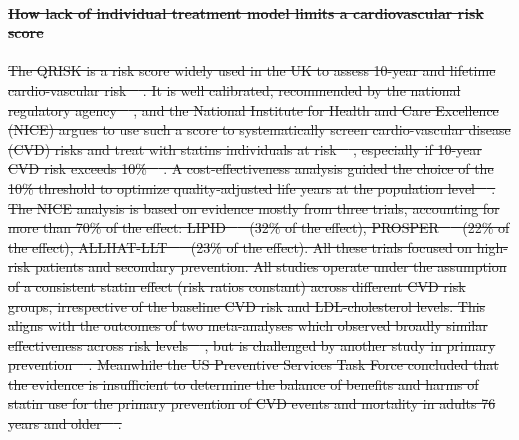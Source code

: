 \documentclass[10pt,letterpaper]{article}
\providecommand{\DIFdeltex}[1]{{\protect\color{red}\sout{#1}}}                      %
\providecommand{\DIFdelbegin}{} %
\providecommand{\DIFdelend}{} %
\providecommand{\DIFdel}[1]{\texorpdfstring{\DIFdeltex{#1}}{}} %
\newcommand{\DIFscaledelfig}{0.5}
\newlength{\DIFdelgraphicswidth} %
\newlength{\DIFdelgraphicsheight} %
\newcommand{\DIFdelincludegraphics}[2][]{%
\sbox{\DIFdelgraphicsbox}{\DIFOincludegraphics[#1]{#2}}%
\settoboxwidth{\DIFdelgraphicswidth}{\DIFdelgraphicsbox} %
\settoboxtotalheight{\DIFdelgraphicsheight}{\DIFdelgraphicsbox} %
\scalebox{\DIFscaledelfig}{%
\parbox[b]{\DIFdelgraphicswidth}{\usebox{\DIFdelgraphicsbox}\\[-\baselineskip] \rule{\DIFdelgraphicswidth}{0em}}\llap{\resizebox{\DIFdelgraphicswidth}{\DIFdelgraphicsheight}{%
\setlength{\unitlength}{\DIFdelgraphicswidth}%
\begin{picture}(1,1)%
\thicklines\linethickness{2pt} %
{\color[rgb]{1,0,0}\put(0,0){\framebox(1,1){}}}%
{\color[rgb]{1,0,0}\put(0,0){\line( 1,1){1}}}%
{\color[rgb]{1,0,0}\put(0,1){\line(1,-1){1}}}%
\end{picture}%
}\hspace*{3pt}}} %
} %
\DeclareRobustCommand{\DIFdelbegin}{\DIFOdelbegin \let\includegraphics\DIFdelincludegraphics} %
\DeclareRobustCommand{\DIFdelend}{\DIFOaddend \let\includegraphics\DIFOincludegraphics} %
\begin{document}
\DIFdelbegin \paragraph{\DIFdel{How lack of individual treatment model limits a cardiovascular risk score}}
\addtocounter{paragraph}{-1}%
\DIFdel{The QRISK is a risk score widely used in the UK to assess 10-year and lifetime cardio-vascular risk \mbox{%
\cite{hippisley2017development}}\hskip0pt%
. It is well calibrated, recommended by the national regulatory agency \mbox{%
\cite{guideline2023cardiovascular}}\hskip0pt%
, and the National Institute for Health and Care Excellence (NICE) argues to use such a score to systematically screen cardio-vascular disease (CVD) risks and treat with statins individuals at risk \mbox{%
\cite{guideline2023cardiovascular}}\hskip0pt%
, especially if 10-year CVD risk exceeds 10\% \mbox{%
\cite{rabar2014lipid}}\hskip0pt%
.
A cost-effectiveness analysis guided the choice of the 10\% threshold to optimize quality-adjusted life years at the population level \mbox{%
\cite{guthrie2023competing}}\hskip0pt%
. The NICE analysis is based on evidence mostly from three trials, accounting for more than 70\% of the effect: LIPID \mbox{%
\cite{long1998prevention} }\hskip0pt%
(32\% of the effect), PROSPER \mbox{%
\cite{shepherd2002pravastatin} }\hskip0pt%
(22\% of the effect), ALLHAT-LLT \mbox{%
\cite{antihypertensive2002major} }\hskip0pt%
(23\% of the effect). All these trials focused on high-risk patients and secondary prevention. All studies operate under the assumption of a consistent statin effect (risk ratios constant) across different CVD risk groups, irrespective of the baseline CVD risk and LDL-cholesterol levels. This aligns with the outcomes of two meta-analyses which observed broadly similar effectiveness across risk levels \mbox{%
\cite{brugts2009benefits}}\hskip0pt%
, but is challenged by another study in primary prevention \mbox{%
\cite{byrne2019statins}}\hskip0pt%
. Meanwhile the US Preventive Services Task Force concluded that the evidence is insufficient to determine the balance of benefits and harms of statin use for the primary prevention of CVD events and mortality in adults 76 years and older \mbox{%
\cite{chou2022statin}}\hskip0pt%
.
}\DIFdelend %
\end{document}
